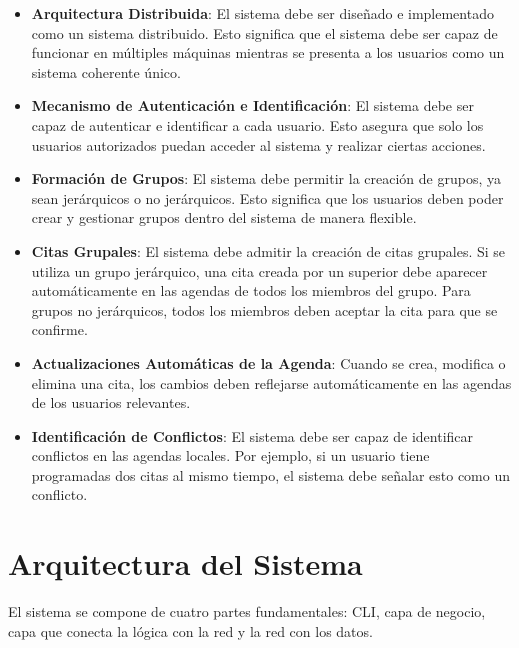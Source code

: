 \documentclass[10pt]{article} %
\begin{document}
	\begin{itemize}
		\item \textbf{Arquitectura Distribuida}: El sistema debe ser diseñado e implementado como un sistema distribuido. Esto significa que el sistema debe ser capaz de funcionar en múltiples máquinas mientras se presenta a los usuarios como un sistema coherente único.
		
		\item \textbf{Mecanismo de Autenticación e Identificación}: El sistema debe ser capaz de autenticar e identificar a cada usuario. Esto asegura que solo los usuarios autorizados puedan acceder al sistema y realizar ciertas acciones.
		
		\item \textbf{Formación de Grupos}: El sistema debe permitir la creación de grupos, ya sean jerárquicos o no jerárquicos. Esto significa que los usuarios deben poder crear y gestionar grupos dentro del sistema de manera flexible.
		
		\item \textbf{Citas Grupales}: El sistema debe admitir la creación de citas grupales. Si se utiliza un grupo jerárquico, una cita creada por un superior debe aparecer automáticamente en las agendas de todos los miembros del grupo. Para grupos no jerárquicos, todos los miembros deben aceptar la cita para que se confirme.
		
		\item \textbf{Actualizaciones Automáticas de la Agenda}: Cuando se crea, modifica o elimina una cita, los cambios deben reflejarse automáticamente en las agendas de los usuarios relevantes.
		
		\item \textbf{Identificación de Conflictos}: El sistema debe ser capaz de identificar conflictos en las agendas locales. Por ejemplo, si un usuario tiene programadas dos citas al mismo tiempo, el sistema debe señalar esto como un conflicto.
		
	\end{itemize}
	
	\section{Arquitectura del Sistema}
	
	El sistema se compone de cuatro partes fundamentales: CLI, capa de negocio, capa que conecta la l\'ogica con la red y la red con los datos.
	
\end{document}
